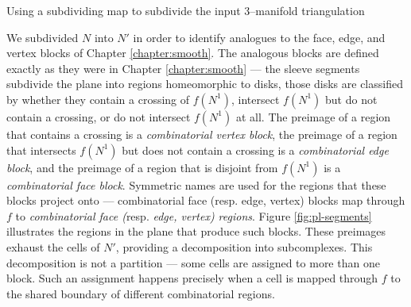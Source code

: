 \begin{algorithm}[h!]
	\caption{Using a subdividing map to subdivide the input 3--manifold triangulation}
	\label{alg:subdividing-manifold}
\end{algorithm}

We subdivided $N$ into $N'$ in order to identify analogues to the face, edge, and vertex blocks of Chapter \ref{chapter:smooth}.
The analogous blocks are defined exactly as they were in Chapter \ref{chapter:smooth} --- the sleeve segments subdivide the plane into regions homeomorphic to disks, those disks are classified by whether they contain a crossing of $f(N^1)$, intersect $f(N^1)$ but do not contain a crossing, or do not intersect $f(N^1)$ at all.
The preimage of a region that contains a crossing is a \emph{combinatorial vertex block}, the preimage of a region that intersects $f(N^1)$ but does not contain a crossing is a \emph{combinatorial edge block}, and the preimage of a region that is disjoint from $f(N^1)$ is a \emph{combinatorial face block}.
Symmetric names are used for the regions that these blocks project onto --- combinatorial face (resp. edge, vertex) blocks map through $f$ to \emph{combinatorial face (}resp. \emph{edge, vertex) regions}.
Figure \ref{fig:pl-segments} illustrates the regions in the plane that produce such blocks.
These preimages exhaust the cells of $N'$, providing a decomposition into subcomplexes.
This decomposition is not a partition --- some cells are assigned to more than one block.
Such an assignment happens precisely when a cell is mapped through $f$ to the shared boundary of different combinatorial regions.

